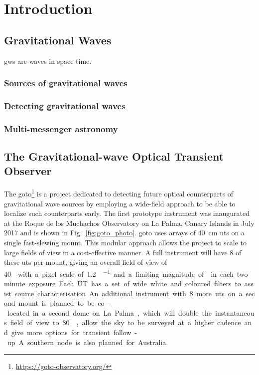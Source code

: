 \chapter{Introduction}
\label{chap:intro}
\chaptoc{}

\newpage
\section{Gravitational Waves}
\label{sec:gw}

\glspl{gw} are waves in space time.

\lipsum{}


\subsection{Sources of gravitational waves}
\label{sec:gw-sources}

\lipsum{}


\subsection{Detecting gravitational waves}
\label{sec:gw-detect}

\lipsum{}

\subsection{Multi-messenger astronomy}
\label{sec:gw-multimessenger}

\lipsum{}


\newpage
\section{The Gravitational-wave Optical Transient Observer}
\label{sec:goto}

The \gls{goto}\footnote{\url{https://goto-observatory.org/}} is a project dedicated to detecting future optical counterparts of gravitational wave sources by employing a wide-field approach to be able to localize such counterparts early. The first prototype instrument was inaugurated at the Roque de los Muchachos Observatory on La Palma, Canary Islands in July 2017 and is shown in Fig.~\ref{fig:goto_photo}. \gls{goto} uses arrays of \SI{40}{\cm} \glspl{ut} on a single fast-slewing mount. This modular approach allows the project to scale to large fields of view in a cost-effective manner. A full instrument will have 8 of these \glspl{ut} per mount, giving an overall field of view of \SI{40}{\square\deg} with a pixel scale of \SI[per-mode=symbol]{1.2}{\arcsec\per\pixel} and a limiting magnitude of  in each two minute exposure. Each UT has a set of wide white and coloured filters to assist source characterisation.  An additional instrument with 8 more \glspl{ut} on a second mount is planned to be co-located in a second dome on La Palma, which will double the instantaneous field of view to \SI{80}{\square\deg}, allow the sky to be surveyed at a higher cadence and give more options for transient follow-up. A southern node is also planned for Australia.

